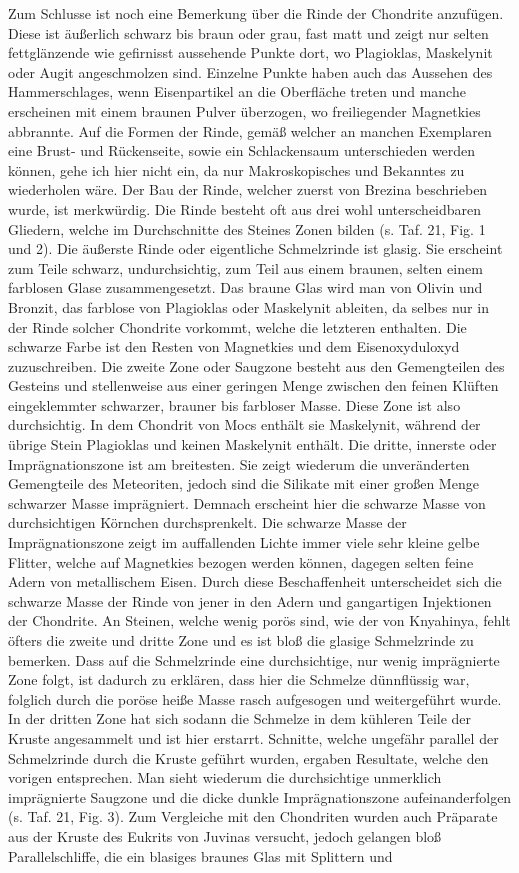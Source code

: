 \documentclass[a4paper, 12pt, oneside]{article}
\begin{document}
Zum Schlusse ist noch eine Bemerkung über die Rinde der Chondrite anzufügen. Diese ist äußerlich schwarz bis braun oder grau, fast matt und zeigt nur selten fettglänzende wie gefirnisst aussehende Punkte dort, wo Plagioklas, Maskelynit oder Augit angeschmolzen sind. Einzelne Punkte haben auch das Aussehen des Hammerschlages, wenn Eisenpartikel an die Oberfläche treten und manche erscheinen mit einem braunen Pulver überzogen, wo freiliegender Magnetkies abbrannte. Auf die Formen der Rinde, gemäß welcher an manchen Exemplaren eine Brust- und Rückenseite, sowie ein Schlackensaum unterschieden werden können, gehe ich hier nicht ein, da nur Makroskopisches und Bekanntes zu wiederholen wäre. Der Bau der Rinde, welcher zuerst von Brezina beschrieben wurde, ist merkwürdig. Die Rinde besteht oft aus drei wohl unterscheidbaren Gliedern, welche im Durchschnitte des Steines Zonen bilden (s. Taf. 21, Fig. 1 und 2). Die äußerste Rinde oder eigentliche Schmelzrinde ist glasig. Sie erscheint zum Teile schwarz, undurchsichtig, zum Teil aus einem braunen, selten einem farblosen Glase zusammengesetzt. Das braune Glas wird man von Olivin und Bronzit, das farblose von Plagioklas oder Maskelynit ableiten, da selbes nur in der Rinde solcher Chondrite vorkommt, welche die letzteren enthalten. Die schwarze Farbe ist den Resten von Magnetkies und dem Eisenoxyduloxyd zuzuschreiben. Die zweite Zone oder Saugzone besteht aus den Gemengteilen des Gesteins und stellenweise aus einer geringen Menge zwischen den feinen Klüften eingeklemmter schwarzer, brauner bis farbloser Masse. Diese Zone ist also durchsichtig. In dem Chondrit von Mocs enthält sie Maskelynit, während der übrige Stein Plagioklas und keinen Maskelynit enthält. Die dritte, innerste oder Imprägnationszone ist am breitesten. Sie zeigt wiederum die unveränderten Gemengteile des Meteoriten, jedoch sind die Silikate mit einer großen Menge schwarzer Masse imprägniert. Demnach erscheint hier die schwarze Masse von durchsichtigen Körnchen durchsprenkelt. Die schwarze Masse der Imprägnationszone zeigt im auffallenden Lichte immer viele sehr kleine gelbe Flitter, welche auf Magnetkies bezogen werden können, dagegen selten feine Adern von metallischem Eisen. Durch diese Beschaffenheit unterscheidet sich die schwarze Masse der Rinde von jener in den Adern und gangartigen Injektionen der Chondrite. An Steinen, welche wenig porös sind, wie der von Knyahinya, fehlt öfters die zweite und dritte Zone und es ist bloß die glasige Schmelzrinde zu bemerken. Dass auf die Schmelzrinde eine durchsichtige, nur wenig imprägnierte Zone folgt, ist dadurch zu erklären, dass hier die Schmelze dünnflüssig war, folglich durch die poröse heiße Masse rasch aufgesogen und weitergeführt wurde. In der dritten Zone hat sich sodann die Schmelze in dem kühleren Teile der Kruste angesammelt und ist hier erstarrt. Schnitte, welche ungefähr parallel der Schmelzrinde durch die Kruste geführt wurden, ergaben Resultate, welche den vorigen entsprechen. Man sieht wiederum die durchsichtige unmerklich imprägnierte Saugzone und die dicke dunkle Imprägnationszone aufeinanderfolgen (s. Taf. 21, Fig. 3). Zum Vergleiche mit den Chondriten wurden auch Präparate aus der Kruste des Eukrits von Juvinas versucht, jedoch gelangen bloß Parallelschliffe, die ein blasiges braunes Glas mit Splittern und 
\end{document}
